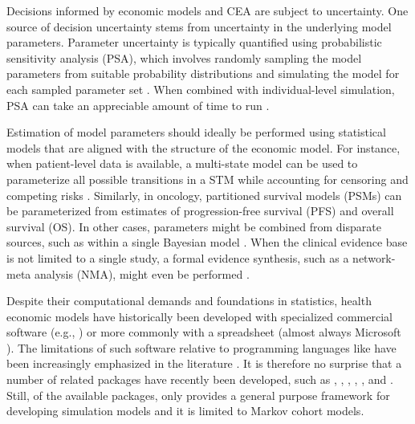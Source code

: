 \documentclass[article, nojss]{jss}\usepackage[]{graphicx}\usepackage[]{color}
\begin{document}
Decisions informed by economic models and CEA are subject to uncertainty. One source of decision uncertainty stems from uncertainty in the underlying model parameters. Parameter uncertainty is typically quantified using probabilistic sensitivity analysis (PSA), which involves randomly sampling the model parameters from suitable probability distributions and simulating the model for each sampled parameter set \citep{claxton2005probabilistic}. When combined with individual-level simulation, PSA can take an appreciable amount of time to run \citep{ohagan2007monte}.

Estimation of model parameters should ideally be performed using statistical models that are aligned with the structure of the economic model. For instance, when patient-level data is available, a multi-state model can be used to parameterize all possible transitions in a STM while accounting for censoring and competing risks \citep{williams2017cost}. Similarly, in oncology, partitioned survival models (PSMs) can be parameterized from estimates of progression-free survival (PFS) and overall survival (OS). In other cases, parameters might be combined from disparate sources, such as within a single Bayesian model \citep{baio2012bayesian}. When the clinical evidence base is not limited to a single study, a formal evidence synthesis, such as a network-meta analysis (NMA), might even be performed \citep{dias2018network}.

Despite their computational demands and foundations in statistics, health economic models have historically been developed with specialized commercial software (e.g., ) or more commonly with a spreadsheet (almost always Microsoft ). The limitations of such software relative to programming languages like  have been increasingly emphasized in the literature \citep{baio2017simple, incerti2019r, jalal2017overview}. It is therefore no surprise that a number of related  packages have recently been developed, such as  \citep{baio2017bayesian},  \citep{strong2014estimating},  \citep{alarid2018dampack},  \citep{heath2018efficient},  \citep{baio2020survhe}, and  \citep{filipovic2017markov}. Still, of the available packages, only  provides a general purpose framework for developing simulation models and it is limited to Markov cohort models. 
\end{document}
